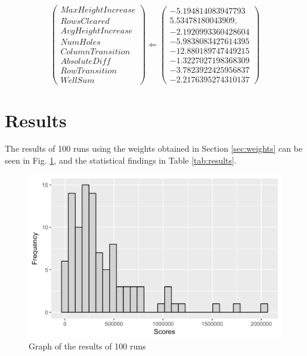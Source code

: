 \documentclass[12pt]{article}
\numberwithin{table}{section}
\numberwithin{figure}{section}
\begin{document}
$$
\left( \begin{array}{c} 
MaxHeightIncrease
\\RowsCleared
\\AvgHeightIncrease
\\NumHoles
\\ColumnTransition
\\AbsoluteDiff
\\RowTransition
\\WellSum
\end{array} \right)
\Longleftarrow\left( \begin{array}{c}
-5.194814083947793
\\5.53478180043909,
\\-2.1920993360428604
\\-5.9838083427614395
\\-12.880189747449215
\\-1.3227027198368309
\\-3.7823922425956837
\\-2.2176395274310137
\end{array} \right)
$$

% 
% 

\section{Results}
The results of 100 runs using the weights obtained in Section \ref{sec:weights} can be seen in Fig. \ref{fig:results}, and the statistical findings in Table \ref{tab:results}.

\begin{figure}[H]
    \centering
    \includegraphics[scale=0.3]{results-frequency-graph.jpeg}
    \caption{Graph of the results of 100 runs}
    \label{fig:results}
\end{figure}
\end{document}
